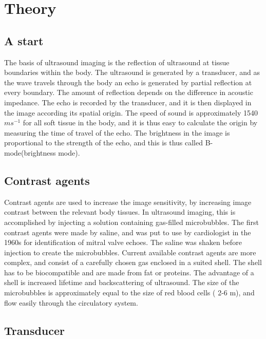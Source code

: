 \section{Theory}
\subsection{A start}
The basis of ultrasound imaging is the reflection of ultrasound at tissue boundaries within the body. The ultrasound is generated by a transducer, and as the wave travels through the body an echo is generated by partial reflection at every boundary. The amount of reflection depends on the difference in acoustic impedance. The echo is recorded by the transducer, and it is then displayed in the image according its spatial origin. The speed of sound is approximately 1540 $m s^{-1}$ for all soft tissue in the body, and it is thus easy to calculate the origin by measuring the time of travel of the echo.  The brightness in the image is proportional to the strength of the echo, and this is thus called B-mode(brightness mode). 



\subsection{Contrast agents}
Contrast agents are used to increase the image sensitivity, by increasing image contrast between the relevant body tissues. In ultrasound imaging, this is accomplished by injecting a solution containing gas-filled microbubbles. 
	The first contrast agents were made by saline, and was put to use by cardiologist in the 1960s for identification of mitral valve echoes. The saline was shaken before injection to create the microbubbles. Current available contrast agents are more complex, and consist of a carefully chosen gas enclosed in a suited shell. The shell has to be biocompatible and are made from fat or proteins. The advantage of a shell is increased lifetime and backscattering of ultrasound. The size of the microbubbles is approximately equal to the size of red blood cells ( 2-6 \mu m), and flow easily through the circulatory system. 
	

\subsection{Transducer}

